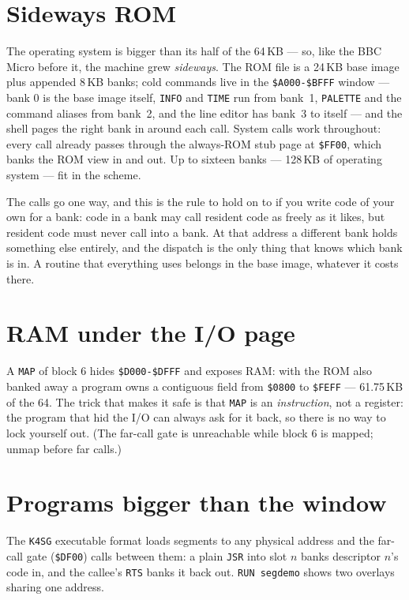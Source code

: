 \section{Sideways ROM}
The operating system is bigger than its half of the 64\,KB --- so, like
the BBC Micro before it, the machine grew \emph{sideways}. The ROM file
is a 24\,KB base image plus appended 8\,KB banks; cold commands live in
the \texttt{\$A000-\$BFFF} window --- bank 0 is the base image itself,
\texttt{INFO} and \texttt{TIME} run from bank~1, \texttt{PALETTE} and
the command aliases from bank~2, and the line editor has bank~3 to
itself --- and the shell pages the right bank in around each call. System calls work throughout:
every call already passes through the always-ROM stub page at
\texttt{\$FF00}, which banks the ROM view in and out. Up to sixteen
banks --- 128\,KB of operating system --- fit in the scheme.

The calls go one way, and this is the rule to hold on to if you write
code of your own for a bank: code in a bank may call resident code as
freely as it likes, but resident code must never call into a bank. At
that address a different bank holds something else entirely, and the
dispatch is the only thing that knows which bank is in. A routine that
everything uses belongs in the base image, whatever it costs there.

\section{RAM under the I/O page}
A \texttt{MAP} of block 6 hides \texttt{\$D000-\$DFFF} and exposes RAM:
with the ROM also banked away a program owns a contiguous field from
\texttt{\$0800} to \texttt{\$FEFF} --- 61.75\,KB of the 64. The trick
that makes it safe is that \texttt{MAP} is an \emph{instruction}, not a
register: the program that hid the I/O can always ask for it back, so
there is no way to lock yourself out. (The far-call gate is unreachable
while block 6 is mapped; unmap before far calls.)

\section{Programs bigger than the window}
The \texttt{K4SG} executable format loads segments to any physical address
and the far-call gate (\verb|$DF00|) calls between them: a plain \verb|JSR|
into slot $n$ banks descriptor $n$'s code in, and the callee's \verb|RTS|
banks it back out. \verb|RUN segdemo| shows two overlays sharing one
address.
